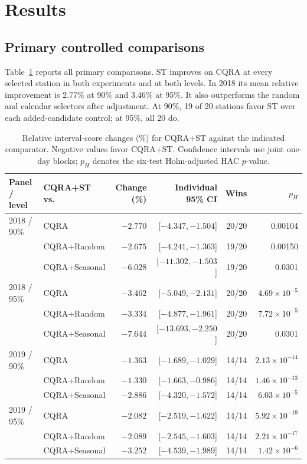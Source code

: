 \documentclass[11pt]{article}
\begin{document}
\section{Results}
\subsection{Primary controlled comparisons}
Table~\ref{tab:main} reports all primary comparisons. ST improves on CQRA at every selected station in both experiments and at both levels. In 2018 its mean relative improvement is 2.77\% at 90\% and 3.46\% at 95\%. It also outperforms the random and calendar selectors after adjustment. At 90\%, 19 of 20 stations favor ST over each added-candidate control; at 95\%, all 20 do.
\begin{table}[H]
	\centering\small
	\caption{Relative interval-score changes (\%) for CQRA+ST
		against the indicated comparator. Negative values favor
		CQRA+ST. Confidence intervals use joint one-day blocks;
		$p_H$ denotes the six-test Holm-adjusted HAC $p$-value.}
	\label{tab:main}
	
	\begin{tabular}{llrrrr}
		\toprule
		Panel / level & CQRA+ST vs. & Change (\%) &
		Individual 95\% CI & Wins & $p_H$\\
		\midrule
		2018 / 90\% & CQRA & $-2.770$ &
		[$-4.347,-1.504$] & 20/20 & 0.00104\\
		& CQRA+Random & $-2.675$ &
		[$-4.241,-1.363$] & 19/20 & 0.00150\\
		& CQRA+Seasonal & $-6.028$ &
		[$-11.302,-1.503$] & 19/20 & 0.0301\\
		
		2018 / 95\% & CQRA & $-3.462$ &
		[$-5.049,-2.131$] & 20/20 &
		$4.69\!\times\!10^{-5}$\\
		& CQRA+Random & $-3.334$ &
		[$-4.877,-1.961$] & 20/20 &
		$7.72\!\times\!10^{-5}$\\
		& CQRA+Seasonal & $-7.644$ &
		[$-13.693,-2.250$] & 20/20 & 0.0301\\
		
		\midrule
		2019 / 90\% & CQRA & $-1.363$ &
		[$-1.689,-1.029$] & 14/14 &
		$2.13\!\times\!10^{-14}$\\
		& CQRA+Random & $-1.330$ &
		[$-1.663,-0.986$] & 14/14 &
		$1.46\!\times\!10^{-13}$\\
		& CQRA+Seasonal & $-2.886$ &
		[$-4.320,-1.572$] & 14/14 &
		$6.03\!\times\!10^{-5}$\\
		
		2019 / 95\% & CQRA & $-2.082$ &
		[$-2.519,-1.622$] & 14/14 &
		$5.92\!\times\!10^{-19}$\\
		& CQRA+Random & $-2.089$ &
		[$-2.545,-1.603$] & 14/14 &
		$2.21\!\times\!10^{-17}$\\
		& CQRA+Seasonal & $-3.252$ &
		[$-4.539,-1.989$] & 14/14 &
		$1.42\!\times\!10^{-6}$\\
		\bottomrule
	\end{tabular}
\end{table}
\end{document}
